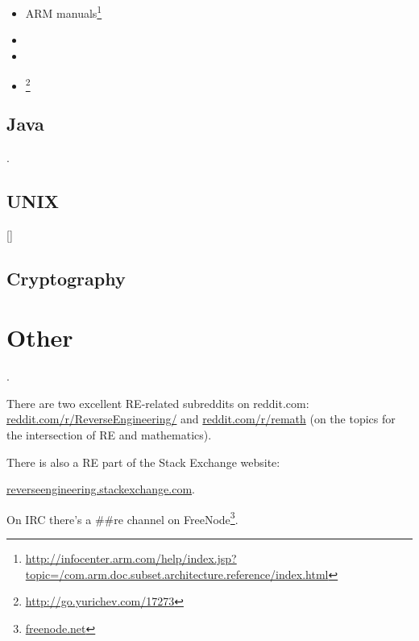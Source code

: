 \begin{itemize}
\item ARM manuals\footnote{\AlsoAvailableAs \url{http://infocenter.arm.com/help/index.jsp?topic=/com.arm.doc.subset.architecture.reference/index.html}}

\item \ARMSevenRef

\item \ARMSixFourRefURL

\item \ARMCookBook\footnote{\AlsoAvailableAs \url{http://go.yurichev.com/17273}}
\end{itemize}

\section{Java}

\JavaBook.

\section{UNIX}

[\TAOUP]

\section{Cryptography}



\chapter{Other}

\HenryWarren.

There are two excellent \ac{RE}-related subreddits on reddit.com:
\href{http://go.yurichev.com/17027}{reddit.com/r/ReverseEngineering/} and
\href{http://go.yurichev.com/17028}{reddit.com/r/remath}
(on the topics for the intersection of \ac{RE} and mathematics).

There is also a \ac{RE} part of the Stack Exchange website:

\par \href{http://go.yurichev.com/17029}{reverseengineering.stackexchange.com}.

On IRC there's a \#\#re channel on
FreeNode\footnote{\href{http://go.yurichev.com/17030}{freenode.net}}.

